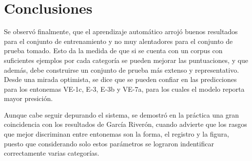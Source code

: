 \chapter*{Conclusiones}\label{chapter:conclusiones}
Se observ\'o finalmente, que el aprendizaje autom\'atico arroj\'o buenos resultados para el conjunto de entrenamiento y no muy alentadores para el conjunto de prueba tomado. Esto da la medida de que si se cuenta con un corpus con suficientes ejemplos por cada categor\'ia se pueden mejorar las puntuaciones, y que adem\'as, debe construirse un conjunto de prueba m\'as extenso y representativo. Desde una mirada optimista, se dice que se pueden confiar en las predicciones para los entonemas VE-1c, E-3, E-3b y VE-7a, para los cuales el modelo reporta mayor presici\'on.


Aunque cabe seguir depurando el sistema, se demostr\'o en la pr\'actica una gran coincidencia con los resultados de Garc\'ia River\'on, cuando advierte que los rasgos que mejor discriminan entre entonemas son la forma, el registro y la figura, puesto que considerando solo estos par\'ametros se lograron indentificar correctamente varias categor\'ias.

\begin{comment}
Malo que bueno, se ha construido el andamiaje para perfeccionar la solucion del problema y se ha capacitado a especialistas de la computacion.

exploratorio

- sirve para detectar los entonemas tal y tal

Lo de las curvas de validacion y eso da bien por el data augmentation pero no generaliza bien
una conclusion q si esta buena es decir q estos features no sirven para la clasificacion solo para ayudar a detectar el entonema 1c
\end{comment}